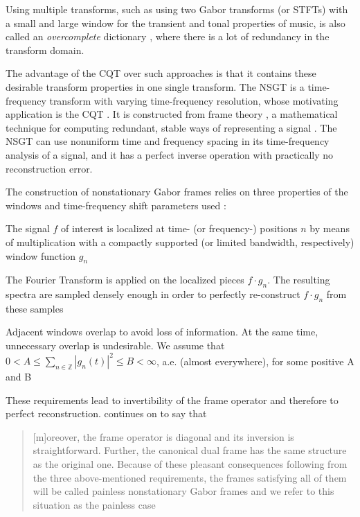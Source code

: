 \documentclass[report.tex]{subfiles}
\begin{document}
Using multiple transforms, such as using two Gabor transforms (or STFTs) with a small and large window for the transient and tonal properties of music, is also called an \textit{overcomplete} dictionary \parencite{dictionary}, where there is a lot of redundancy in the transform domain.

The advantage of the CQT over such approaches is that it contains these desirable transform properties in one single transform. The NSGT is a time-frequency transform with varying time-frequency resolution, whose motivating application is the CQT \parencite{jaillet, balazs}. It is constructed from frame theory \parencite{frametheory}, a mathematical technique for computing redundant, stable ways of representing a signal \parencite{framesintro}. The NSGT can use nonuniform time and frequency spacing in its time-frequency analysis of a signal, and it has a perfect inverse operation with practically no reconstruction error.

The construction of nonstationary Gabor frames relies on three properties of the windows and time-frequency shift parameters used \parencite[2]{balazs}:
\begin{tight_itemize}
	\item
		The signal $f$ of interest is localized at time- (or frequency-) positions $n$ by means of multiplication with a compactly supported (or limited bandwidth, respectively) window function $g_{n}$
	\item
		The Fourier Transform is applied on the localized pieces $f \cdot g_{n}$. The resulting spectra are sampled densely enough in order to perfectly re-construct $f \cdot g_{n}$ from these samples
	\item
		Adjacent windows overlap to avoid loss of information. At the same time, unnecessary overlap is undesirable. We assume that $0 < A \le \sum_{n \in \mathbb{Z}}|g_{n}(t)|^{2} \le B < \infty$, a.e. (almost everywhere), for some positive A and B
\end{tight_itemize}

These requirements lead to invertibility of the frame operator and therefore to perfect reconstruction. \citeauthor{balazs} continues on to say that

\begin{quote}
	[m]oreover, the frame operator is diagonal and its inversion is straightforward. Further, the canonical dual frame has the same structure as the original one. Because of these pleasant consequences following from the three above-mentioned requirements, the frames satisfying all of them will be called painless nonstationary Gabor frames and we refer to this situation as the painless case \parencite[1,482]{balazs}
\end{quote}
\end{document}
